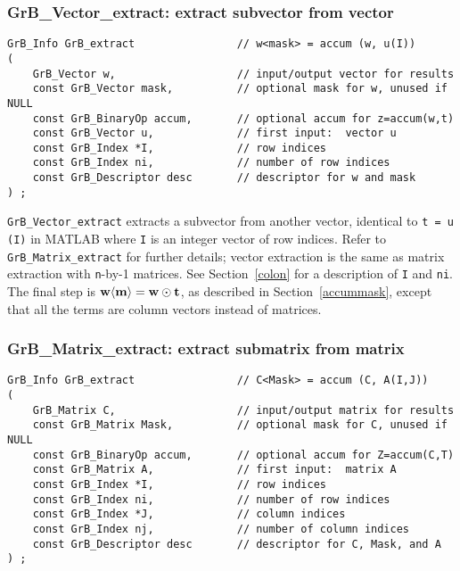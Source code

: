 \documentclass[12pt]{article}
\begin{document}
\subsubsection{{\sf GrB\_Vector\_extract:} extract subvector from vector}
\label{extract_vector}

\begin{mdframed}[userdefinedwidth=6in]
{\footnotesize
\begin{verbatim}
GrB_Info GrB_extract                // w<mask> = accum (w, u(I))
(
    GrB_Vector w,                   // input/output vector for results
    const GrB_Vector mask,          // optional mask for w, unused if NULL
    const GrB_BinaryOp accum,       // optional accum for z=accum(w,t)
    const GrB_Vector u,             // first input:  vector u
    const GrB_Index *I,             // row indices
    const GrB_Index ni,             // number of row indices
    const GrB_Descriptor desc       // descriptor for w and mask
) ;
\end{verbatim} } \end{mdframed}

\verb'GrB_Vector_extract' extracts a subvector from another vector, identical
to \verb't = u (I)' in MATLAB where \verb'I' is an integer vector of row
indices.  Refer to \verb'GrB_Matrix_extract' for further details; vector
extraction is the same as matrix extraction with \verb'n'-by-1 matrices.
See Section~\ref{colon} for a description of \verb'I' and \verb'ni'.
The final step is ${\bf w \langle m \rangle  = w \odot
t}$, as described in Section~\ref{accummask}, except that all the terms are
column vectors instead of matrices.

\newpage
\subsubsection{{\sf GrB\_Matrix\_extract:} extract submatrix from matrix}
\label{extract_matrix}

\begin{mdframed}[userdefinedwidth=6in]
{\footnotesize
\begin{verbatim}
GrB_Info GrB_extract                // C<Mask> = accum (C, A(I,J))
(
    GrB_Matrix C,                   // input/output matrix for results
    const GrB_Matrix Mask,          // optional mask for C, unused if NULL
    const GrB_BinaryOp accum,       // optional accum for Z=accum(C,T)
    const GrB_Matrix A,             // first input:  matrix A
    const GrB_Index *I,             // row indices
    const GrB_Index ni,             // number of row indices
    const GrB_Index *J,             // column indices
    const GrB_Index nj,             // number of column indices
    const GrB_Descriptor desc       // descriptor for C, Mask, and A
) ;
\end{verbatim} } \end{mdframed}
\end{document}
